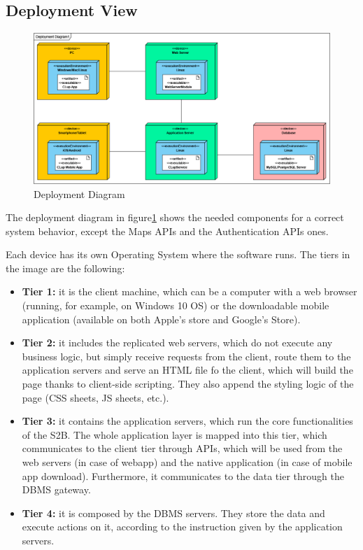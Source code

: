 \documentclass[table, 12pt]{article}
\begin{document}
\subsection{Deployment View}

\begin{figure}[H]
    \begin{center}
        \includegraphics[width=\textwidth]{assets/Deployment-Diagram/DeploymentDiagram1.png}
        \caption{Deployment Diagram}\label{deployment_diagram}
    \end{center}
\end{figure}

The deployment diagram in figure\ref{deployment_diagram} shows the needed components for a correct system behavior, except the Maps APIs and the Authentication APIs ones.

Each device has its own Operating System where the software runs. The tiers in the image are the following:
\begin{itemize}
    \item \textbf{Tier 1:} it is the client machine, which can be a computer with a web browser (running, for example, on Windows 10 OS) or the downloadable mobile application (available on both Apple's store and Google's Store).
    \item \textbf{Tier 2:} it includes the replicated web servers, which do not execute any business logic, but simply receive requests from the client, route them to the application servers and serve an HTML file fo the client, which will build the page thanks to client-side scripting. They also append the styling logic of the page (CSS sheets, JS sheets, etc.).
    \item \textbf{Tier 3:} it contains the application servers, which run the core functionalities of the S2B. The whole application layer is mapped into this tier, which communicates to the client tier through APIs, which will be used from the web servers (in case of webapp) and the native application (in case of mobile app download). Furthermore, it communicates to the data tier through the DBMS gateway.
    \item \textbf{Tier 4:} it is composed by the DBMS servers. They store the data and execute actions on it, according to the instruction given by the application servers.
\end{itemize}
\end{document}

